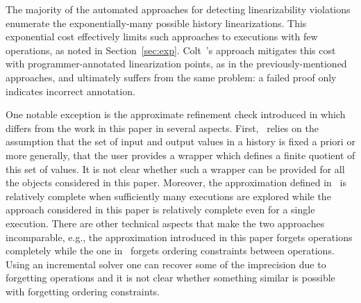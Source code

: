 The majority of the automated approaches for detecting linearizability 
violations~\cite{conf/pldi/BurckhardtDMT10,DBLP:conf/asplos/BurnimNS11,DBLP:conf/kbse/ZhangCW13,DBLP:journals/jpdc/WingG93} 
enumerate the exponentially-many
possible history linearizations. This exponential cost effectively limits such
approaches to executions with few operations, as noted in
Section~\ref{sec:exp}. Colt~\cite{conf/oopsla/ShachamBASVY11}'s
approach mitigates this cost with programmer-annotated linearization points, as
in the previously-mentioned approaches, and ultimately suffers from the same
problem: a failed proof only indicates incorrect annotation.

One notable exception is the approximate refinement check introduced in \cite{conf/popl/BouajjaniEEH15}
which differs from the work in this paper in several aspects. First,~\cite{conf/popl/BouajjaniEEH15}
relies on the assumption that the set of input and output values in a history is fixed
a priori or more generally, that the user provides a wrapper which defines a finite
quotient of this set of values. It is not clear whether such a wrapper can be provided
for all the objects considered in this paper. Moreover, the approximation defined in~\cite{conf/popl/BouajjaniEEH15}
is relatively complete when sufficiently many executions are explored while
the approach considered in this paper is relatively complete even for a single execution.
There are other technical aspects that make the two approaches incomparable, 
e.g., the approximation introduced in this paper forgets operations completely while the one 
in~\cite{conf/popl/BouajjaniEEH15} forgets ordering constraints between operations.
Using an incremental solver one can recover some of the imprecision due
to forgetting operations and it is not clear whether something similar is possible with
forgetting ordering constraints.





